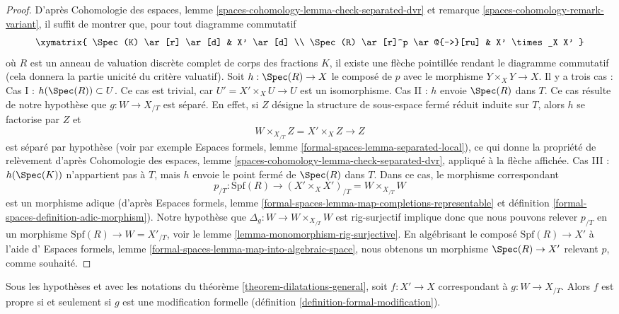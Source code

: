 \begin{proof}
\medskip\noindent
D'après Cohomologie des espaces, lemme
\ref{spaces-cohomology-lemma-check-separated-dvr} et
remarque \ref{spaces-cohomology-remark-variant},
il suffit de montrer que, pour tout diagramme commutatif
$$
\xymatrix{
\Spec(K) \ar[r] \ar[d] & X' \ar[d] \\
\Spec(R) \ar[r]^p \ar@{-->}[ru] & X' \times_X X'
}
$$
où $R$ est un anneau de valuation discrète complet de corps des fractions
$K$, il existe une flèche pointillée rendant le diagramme commutatif (cela
donnera la partie unicité du critère valuatif). Soit
$h : \Spec(R) \to X$ le composé de $p$ avec le morphisme
$Y \times_X Y \to X$. Il y a trois cas :
Cas I : $h(\Spec(R)) \subset U$. Ce cas est trivial,
car $U' = X' \times_X U \to U$ est un isomorphisme.
Cas II : $h$ envoie $\Spec(R)$ dans $T$. Ce cas résulte
de notre hypothèse que $g : W \to X_{/T}$ est séparé. En effet,
si $Z$ désigne la structure de sous-espace fermé réduit induite
sur $T$, alors $h$ se factorise par $Z$ et
$$
W \times_{X_{/T}} Z = X' \times_X Z \longrightarrow Z
$$
est séparé par hypothèse (voir par exemple
Espaces formels, lemme \ref{formal-spaces-lemma-separated-local}),
ce qui donne la propriété de relèvement d'après
Cohomologie des espaces, lemme \ref{spaces-cohomology-lemma-check-separated-dvr},
appliqué à la flèche affichée. Cas III : $h(\Spec(K))$ n'appartient pas à
$T$, mais $h$ envoie le point fermé de $\Spec(R)$ dans $T$. Dans ce cas,
le morphisme correspondant
$$
p_{/T} :
\text{Spf}(R)
\longrightarrow
(X' \times_X X')_{/T} =
W \times_{X_{/T}} W
$$
est un morphisme adique (d'après
Espaces formels, lemme
\ref{formal-spaces-lemma-map-completions-representable} et
définition \ref{formal-spaces-definition-adic-morphism}).
Notre hypothèse que
$\Delta_g : W \to W \times_{X_{/T}} W$ est rig-surjectif implique donc que
nous pouvons relever $p_{/T}$ en un morphisme
$\text{Spf}(R) \to W = X'_{/T}$, voir le
lemme \ref{lemma-monomorphism-rig-surjective}.
En algébrisant le composé $\text{Spf}(R) \to X'$ à l'aide d'
Espaces formels, lemme \ref{formal-spaces-lemma-map-into-algebraic-space},
nous obtenons un morphisme $\Spec(R) \to X'$ relevant $p$, comme souhaité.
\end{proof}

\begin{lemma}
\label{lemma-output-proper}
Sous les hypothèses et avec les notations du
théorème \ref{theorem-dilatations-general}, soit $f : X' \to X$
correspondant à $g : W \to X_{/T}$.
Alors $f$ est propre si et seulement si $g$ est une modification formelle
(définition \ref{definition-formal-modification}).
\end{lemma}

